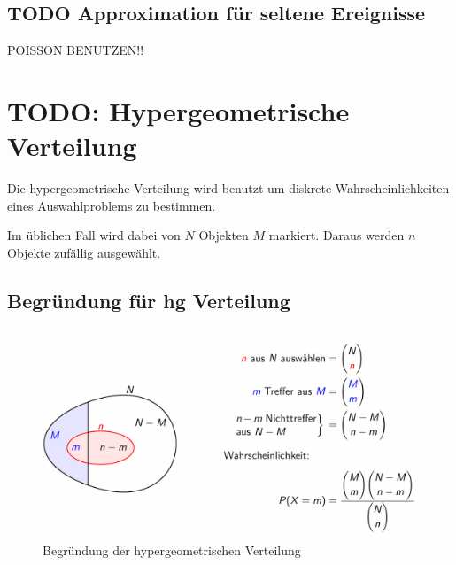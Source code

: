 \documentclass[../Main.tex]{subfiles}
\begin{document}
\subsection{TODO Approximation für seltene Ereignisse}
POISSON BENUTZEN!!

\section{TODO: Hypergeometrische Verteilung}
Die hypergeometrische Verteilung wird benutzt um
diskrete Wahrscheinlichkeiten eines Auswahlproblems zu bestimmen.

Im üblichen Fall wird dabei von \(N\) Objekten \(M\) markiert.
Daraus werden \(n\) Objekte zufällig ausgewählt.



\subsection{Begründung für hg Verteilung}
    
\begin{figure}[H]
    \centering
    \includegraphics[width=0.75\linewidth]{Images/begr-hg-verteilung.png}
    \caption{Begründung der hypergeometrischen Verteilung}
\end{figure}
\end{document}
